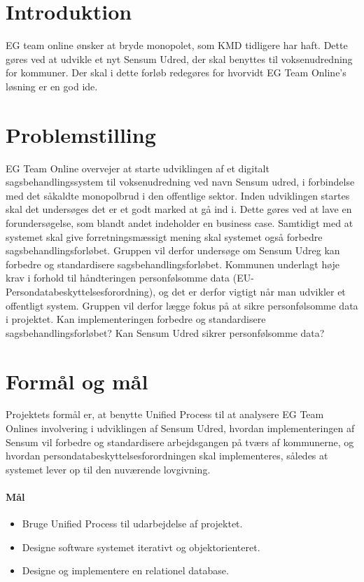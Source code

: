 \documentclass[../../main.tex]{subfiles}
\begin{document}
\section{Introduktion}
EG team online ønsker at bryde monopolet, som KMD tidligere har haft.
Dette gøres ved at udvikle et nyt Sensum Udred, der skal benyttes til voksenudredning for kommuner.
Der skal i dette forløb redegøres for hvorvidt EG Team Online’s løsning er en god ide.

\section{Problemstilling}
EG Team Online overvejer at starte udviklingen af et digitalt sagsbehandlingssystem
til voksenudredning ved navn Sensum udred, i forbindelse med det såkaldte
monopolbrud i den offentlige sektor. Inden udviklingen startes skal det undersøges
det er et godt marked at gå ind i. Dette gøres ved at lave en forundersøgelse, som
blandt andet indeholder en business case. Samtidigt med at systemet skal give
forretningsmæssigt mening skal systemet også forbedre sagsbehandlingsforløbet.
Gruppen vil derfor undersøge om Sensum Udreg kan forbedre og standardisere
sagsbehandlingsforløbet.
Kommunen underlagt høje krav i forhold til håndteringen personfølsomme
data (EU-Persondatabeskyttelsesforordning), og det er derfor vigtigt når man
udvikler et offentligt system. Gruppen vil derfor lægge fokus på at sikre
personfølsomme data i projektet. Kan implementeringen forbedre og standardisere
sagsbehandlingsforløbet? Kan Sensum Udred sikrer personfølsomme data?

\section{Formål og mål}
Projektets formål er, at benytte Unified Process til at analysere EG Team Onlines
involvering i udviklingen af Sensum Udred, hvordan implementeringen af
Sensum vil forbedre og standardisere arbejdsgangen på tværs af kommunerne, og
hvordan persondatabeskyttelsesforordningen skal implementeres, således at systemet
lever op til den nuværende lovgivning.

\paragraph{Mål}
\begin{itemize}
  \item Bruge Unified Process til udarbejdelse af projektet.
  \item Designe software systemet iterativt og objektorienteret.
  \item Designe og implementere en relationel database.
\end{itemize}
\end{document}

